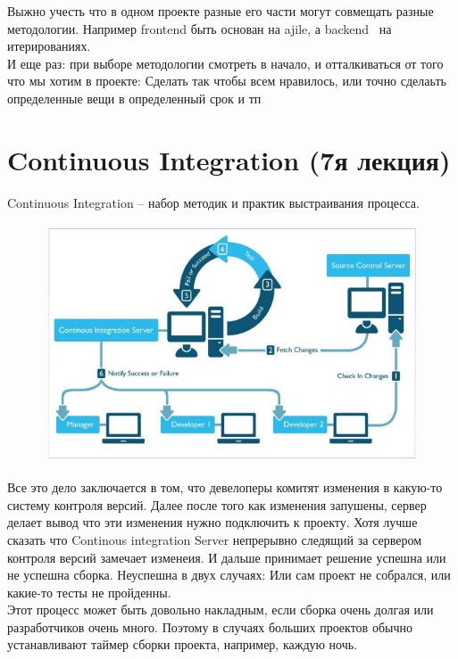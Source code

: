 \documentclass[12pt; a4paper]{book}
\theoremstyle{plain} %
\theoremstyle{defenition}
\theoremstyle{remark}
\begin{document}
 Выжно учесть что в одном проекте разные его части могут совмещать разные методологии. Например frontend быть основан на ajile, а backend  на итерированиях.\\
 И еще раз: при выборе методологии смотреть в начало, и отталкиваться от того что мы хотим в проекте: Сделать так чтобы всем нравилось, или точно сделаьть определенные вещи в определенный срок и тп

\newpage
\section{Continuous Integration (7я лекция)}
 Continuous Integration -- набор методик и практик выстраивания процесса.
\begin{figure}[!htbp]
\includegraphics[angle=0, width=\textwidth]{IMG/16} \\
\end{figure}
Все это дело заключается в том, что девелоперы комитят изменения в какую-то систему контроля версий.
Далее после того как изменения запушены, сервер делает вывод что эти изменения нужно подключить к проекту. Хотя лучше сказать что Continous integration Server непрерывно следящий за сервером контроля версий замечает изменеия. И дальше принимает решение успешна или не успешна сборка. Неуспешна в двух случаях: Или сам проект не собрался, или какие-то тесты не пройденны.\\
Этот процесс может быть довольно накладным, если сборка очень долгая или разработчиков очень много. Поэтому в случаях больших проектов обычно устанавливают таймер сборки проекта, например, каждую ночь.
\end{document}
